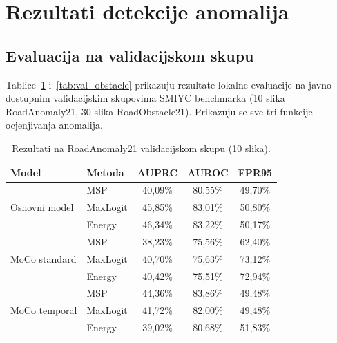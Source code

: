 \documentclass[diplomskirad]{fer}
\begin{document}
\section{Rezultati detekcije anomalija}
\label{sec:rezultati_anomalije}

\subsection{Evaluacija na validacijskom skupu}

Tablice~\ref{tab:val_anomaly} i~\ref{tab:val_obstacle} prikazuju
rezultate lokalne evaluacije na javno dostupnim validacijskim
skupovima SMIYC benchmarka (10 slika RoadAnomaly21, 30 slika
RoadObstacle21). Prikazuju se sve tri funkcije ocjenjivanja
anomalija.

\begin{table}[H]
	\centering
	\caption{Rezultati na RoadAnomaly21 validacijskom skupu
		(10 slika).}
	\label{tab:val_anomaly}
	\begin{tabular}{|l|l|c|c|c|}
		\hline
		\textbf{Model} & \textbf{Metoda} & \textbf{AUPRC} &
		\textbf{AUROC} & \textbf{FPR95} \\
		\hline
		\multirow{3}{*}{Osnovni model}
		& MSP      & 40{,}09\% & 80{,}55\% & 49{,}70\% \\
		& MaxLogit & 45{,}85\% & 83{,}01\% & 50{,}80\% \\
		& Energy   & 46{,}34\% & 83{,}22\% & 50{,}17\% \\
		\hline
		\multirow{3}{*}{MoCo standard}
		& MSP      & 38{,}23\% & 75{,}56\% & 62{,}40\% \\
		& MaxLogit & 40{,}70\% & 75{,}63\% & 73{,}12\% \\
		& Energy   & 40{,}42\% & 75{,}51\% & 72{,}94\% \\
		\hline
		\multirow{3}{*}{MoCo temporal}
		& MSP      & 44{,}36\% & 83{,}86\% & 49{,}48\% \\
		& MaxLogit & 41{,}72\% & 82{,}00\% & 49{,}48\% \\
		& Energy   & 39{,}02\% & 80{,}68\% & 51{,}83\% \\
		\hline
	\end{tabular}
\end{table}
\end{document}
